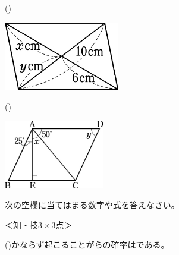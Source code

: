 \documentclass[
  12pt,a4paper,lualatex,ja=standard]{bxjsarticle}
\begin{document}
\begin{flushleft}
\begin{multicols}{2}
\end{multicols}

\vspace{5mm}

\begin{multicols}{2}
()\hspace{2.5pt}

\begin{center}
\def\@captype{figure}
\includegraphics[height=30mm]{img/img3.jpg}

\end{center}

\columnbreak

()\hspace{2.5pt}

\begin{center}
\def\@captype{figure}
\includegraphics[height=30mm]{img/img4.jpg}

\end{center}

\end{multicols}

\setcounter{skaunta}{0}

\vspace{5mm}

\noindent{} \hspace{1pt}次の空欄に当てはまる数字や式を答えなさい。

%
\begin{flushright}%
\footnotesize{＜知・技$3 \times 3$点＞}%
\end{flushright}%


()\hspace{2.5pt}かならず起こることがらの確率はである。


\end{flushleft}
\end{document}
